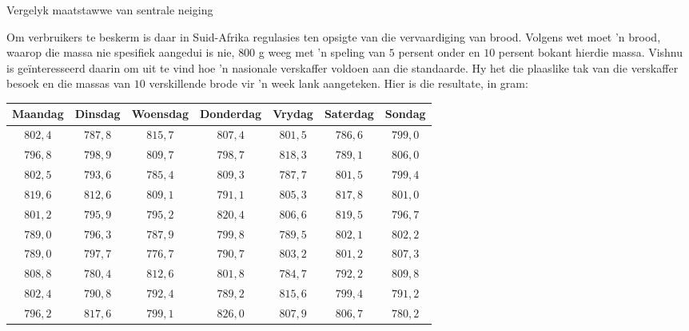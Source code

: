 \clearpage
\begin{wex}{
Vergelyk maatstawwe van sentrale neiging
}
{Om verbruikers te beskerm is daar in Suid-Afrika regulasies ten opsigte van die vervaardiging van brood. Volgens wet moet ’n brood, waarop die massa nie spesifiek aangedui is nie, $800$ g weeg met ’n speling van $5$ persent onder en $10$ persent bokant hierdie massa. Vishnu is geïnteresseerd daarin om uit te vind hoe ’n nasionale verskaffer voldoen aan die standaarde. Hy het die plaaslike tak van die verskaffer besoek en die massas van $10$ verskillende brode vir ’n week lank aangeteken. Hier is die resultate, in gram:\\
\vspace*{-20pt}
    \begin{center}
      \begin{tabular}{|c|c|c|c|c|c|c|} \hline
       
        \textbf{Maandag} & \textbf{Dinsdag} & \textbf{Woensdag} & \textbf{ Donderdag} & \textbf{Vrydag} & \textbf{Saterdag} & \textbf{Sondag} \\ \hline
        
        $802,4$ & $787,8$ & $815,7$ & $807,4$ & $801,5$ & $786,6$ & $799,0$ \\ \hline
        $796,8$ & $798,9$ & $809,7$ & $798,7$ & $818,3$ & $789,1$ & $806,0$ \\ \hline
        $802,5$ & $793,6$ & $785,4$ & $809,3$ & $787,7$ & $801,5$ & $799,4$ \\ \hline
        $819,6$ & $812,6$ & $809,1$ & $791,1$ & $805,3$ & $817,8$ & $801,0$ \\ \hline
        $801,2$ & $795,9$ & $795,2$ & $820,4$ & $806,6$ & $819,5$ & $796,7$ \\ \hline
        $789,0$ & $796,3$ & $787,9$ & $799,8$ & $789,5$ & $802,1$ & $802,2$ \\ \hline
        $789,0$ & $797,7$ & $776,7$ & $790,7$ & $803,2$ & $801,2$ & $807,3$ \\ \hline
        $808,8$ & $780,4$ & $812,6$ & $801,8$ & $784,7$ & $792,2$ & $809,8$ \\ \hline
        $802,4$ & $790,8$ & $792,4$ & $789,2$ & $815,6$ & $799,4$ & $791,2$ \\ \hline
        $796,2$ & $817,6$ & $799,1$ & $826,0$ & $807,9$ & $806,7$ & $780,2$ \\ \hline
       

\end{tabular}
\end{center}}
\end{wex}
